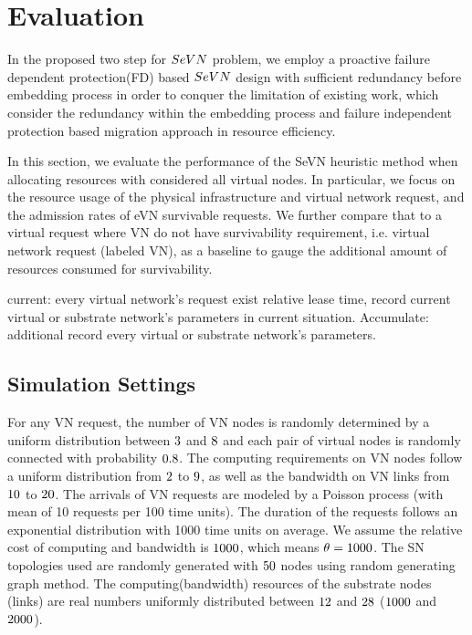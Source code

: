
\section{Evaluation}
In the proposed two step for $SeVN$ problem, we employ a proactive failure dependent protection(FD) based $SeVN$ design with sufficient redundancy before embedding process in order to conquer the limitation of existing work, which consider the redundancy within the embedding process and failure independent protection based migration approach in resource efficiency.


In this section, we evaluate the performance of the SeVN heuristic method when allocating resources with considered all virtual nodes. In particular, we focus on the resource usage of the physical infrastructure and virtual network request, and the admission rates of eVN survivable requests. We further compare that to a virtual request where VN do not have survivability requirement, i.e.
virtual network request (labeled VN), as a baseline to gauge the additional amount of resources consumed for survivability.

current: every virtual network's request exist relative lease time, record current virtual or substrate network's parameters in current situation.
Accumulate: additional record every virtual or substrate network's parameters.

\subsection{Simulation Settings}
For any VN request, the number of VN nodes is randomly determined by a uniform distribution between $3$ and $8$ and each pair of virtual nodes is randomly connected with probability $0.8$. The computing requirements on VN nodes follow a uniform distribution from $2$ to $9$, as well as the bandwidth on VN links from $10$ to $20$. The arrivals of VN requests are modeled by a Poisson process (with mean of 10 requests per 100 time units). The duration of the requests follows an exponential distribution with 1000 time units on average.
We assume the relative cost of computing and bandwidth is $1000$\cite{armbrust2009above,yu2010survivable}, which means $\theta=1000$. The SN topologies used are randomly generated with $50$ nodes using random generating graph method. The computing(bandwidth) resources of the substrate nodes (links) are real
numbers uniformly distributed between $12$ and $28$ ($1000$ and
$2000$).

